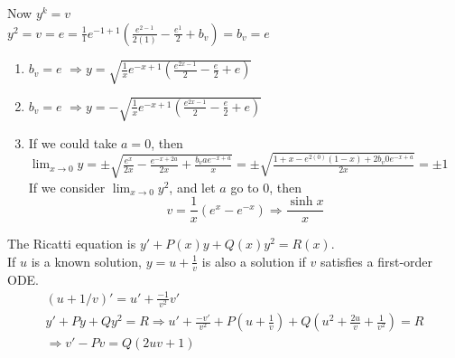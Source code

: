 \documentclass[twoside]{amsart}
\theoremstyle{plain}
\theoremstyle{definition}
\newcommand{\exercisehead}[1]
  {\smallskip
   \noindent{\small\bf Exercise #1.}}
\begin{document}
Now $y^k = v$ \medskip \\
$y^2 = v = e = \frac{1}{1} e^{-1+1} \left( \frac{ e^{2-1} }{ 2(1) } - \frac{e^1}{2} + b_v \right) = b_v = e$
\begin{enumerate}
\item $b_v = e$  \quad $\Longrightarrow y = \sqrt{ \frac{1}{x} e^{-x+1} \left( \frac{e^{2x-1}}{2 } - \frac{e}{2} + e \right)  } $
\item $b_v =e $ \quad $\Longrightarrow y = - \sqrt{ \frac{1}{x} e^{-x+1} \left( \frac{e^{2x-1}}{2 } - \frac{e}{2} + e \right)  } $
\item If we could take $a=0$, then $\lim_{x\to 0} y = \pm \sqrt{ \frac{ e^x}{ 2x} - \frac{ e^{-x +2a }}{ 2x} + \frac{b_v ae^{-x+a}}{ x } } = \pm \sqrt{ \frac{ 1 + x - e^{2(0)}(1-x) + 2b_v 0 e^{-x+a} }{2x} } = \pm 1$ \medskip \\

If we consider $\lim_{x\to 0} y^2$, and let $a$ go to $0$, then 
\[
  v = \frac{1}{x} \left( e^{x} - e^{-x} \right) \Longrightarrow \frac{ \sinh{x}}{x}
\]
\end{enumerate}

\exercisehead{19} The Ricatti equation is $y' + P(x)y + Q(x) y^2 = R(x)$.  \medskip \\
If $u$ is a known solution, $y = u + \frac{1}{v}$ is also a solution if $v$ satisfies a first-order ODE.  
\[
\begin{gathered}
  (u + 1/v)' = u' + \frac{-1}{v^2} v' \\
  y' + P y + Qy^2 = R  \Longrightarrow u' + \frac{-v'}{v^2} + P(u+\frac{1}{v} ) + Q( u^2 + \frac{2u}{v} + \frac{1}{v^2} ) = R \\ \Longrightarrow \boxed{ v' -Pv = Q(2uv+1)  }
\end{gathered}
\]
\end{document}
